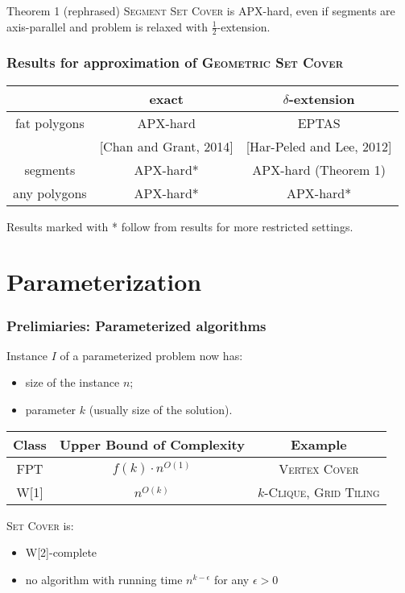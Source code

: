 \documentclass{beamer}
\begin{document}
\begin{frame}
\begin{block}{Theorem 1 (rephrased)}
	\textsc{Segment Set Cover} is APX-hard, even if segments are axis-parallel
	and problem is relaxed with $\frac{1}{2}$-extension.
\end{block}


\end{frame}


\begin{frame}
\frametitle{Results for approximation of \textsc{Geometric Set Cover}}
\begin{tabular}{|c|c|c|}
\hline
           & exact & $\delta$-extension \\
\hline
fat polygons & APX-hard  &  EPTAS \\
& [Chan and Grant, 2014] & [Har-Peled and Lee, 2012] \\
\hline
segments & \textcolor{olivegreen}{APX-hard*} & \textcolor{olivegreen}{APX-hard (Theorem 1)} \\
\hline
any polygons & APX-hard* &  \textcolor{olivegreen}{APX-hard*} \\
\hline
\end{tabular}

\bigskip
Results marked with * follow from results for more restricted settings.

\end{frame}

\section{Parameterization}

\begin{frame}
\frametitle{Prelimiaries: Parameterized algorithms}
Instance $I$ of a parameterized problem now has:
\begin{itemize}
\item size of the instance $n$;
\item parameter $k$ (usually size of the solution).
\end{itemize}
\bigskip

\begin{tabular}{|c|c|c|}
\hline
\textbf{Class} & \textbf{Upper Bound of Complexity} & \textbf{Example}\\
\hline
FPT & $f(k) \cdot n^{O(1)}$ & \textsc{Vertex Cover}\\
\hline
W[1] & $n^{O(k)}$ & \textsc{$k$-Clique}, \textsc{Grid Tiling}\\
\hline
\end{tabular}

\pause

\bigskip
\textsc{Set Cover} is:
\begin{itemize}
\item W[2]-complete
\item no algorithm with running time $n^{k-\epsilon}$ for any $\epsilon > 0$
\end{itemize}
\end{frame}
\end{document}
